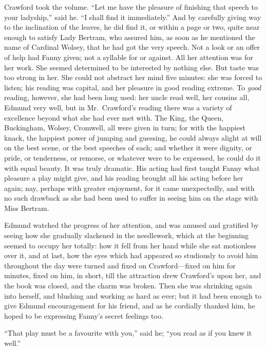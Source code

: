 \documentclass{article}
\begin{document}
Crawford took the volume.  ``Let me have the pleasure
of finishing that speech to your ladyship,'' said he.
``I shall find it immediately.''  And by carefully giving
way to the inclination of the leaves, he did find it,
or within a page or two, quite near enough to satisfy
Lady Bertram, who assured him, as soon as he mentioned the
name of Cardinal Wolsey, that he had got the very speech.
Not a look or an offer of help had Fanny given; not a syllable
for or against.  All her attention was for her work.
She seemed determined to be interested by nothing else.
But taste was too strong in her.  She could not abstract
her mind five minutes:  she was forced to listen; his reading
was capital, and her pleasure in good reading extreme.
To \emph{good} reading, however, she had been long used:
her uncle read well, her cousins all, Edmund very well,
but in Mr.\ Crawford's reading there was a variety of
excellence beyond what she had ever met with.  The King,
the Queen, Buckingham, Wolsey, Cromwell, all were given
in turn; for with the happiest knack, the happiest
power of jumping and guessing, he could always alight
at will on the best scene, or the best speeches of each;
and whether it were dignity, or pride, or tenderness,
or remorse, or whatever were to be expressed, he could
do it with equal beauty.  It was truly dramatic.
His acting had first taught Fanny what pleasure a play
might give, and his reading brought all his acting before
her again; nay, perhaps with greater enjoyment, for it
came unexpectedly, and with no such drawback as she had
been used to suffer in seeing him on the stage with Miss
Bertram.

Edmund watched the progress of her attention, and was
amused and gratified by seeing how she gradually slackened
in the needlework, which at the beginning seemed to
occupy her totally:  how it fell from her hand while
she sat motionless over it, and at last, how the eyes
which had appeared so studiously to avoid him throughout
the day were turned and fixed on Crawford---fixed on him
for minutes, fixed on him, in short, till the attraction
drew Crawford's upon her, and the book was closed,
and the charm was broken.  Then she was shrinking again
into herself, and blushing and working as hard as ever;
but it had been enough to give Edmund encouragement
for his friend, and as he cordially thanked him,
he hoped to be expressing Fanny's secret feelings too.

``That play must be a favourite with you,'' said he;
``you read as if you knew it well.''
\end{document}
